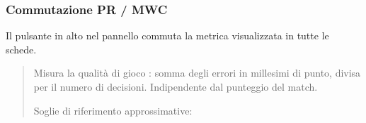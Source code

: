 \documentclass[letterpaper,10pt,italian]{sphinxmanual}
\begin{document}
\subsubsection{Commutazione PR / MWC}
\label{\detokenize{manuel:toggle-pr-mwc}}
\sphinxAtStartPar
Il pulsante  in alto nel pannello commuta la metrica visualizzata in tutte le schede.

\sphinxAtStartPar
{}
\begin{quote}

\sphinxAtStartPar
Misura la qualità di gioco : somma degli errori in millesimi di punto, divisa per il numero di decisioni. Indipendente dal punteggio del match.

\sphinxAtStartPar
Soglie di riferimento approssimative:



\end{quote}
\end{document}
